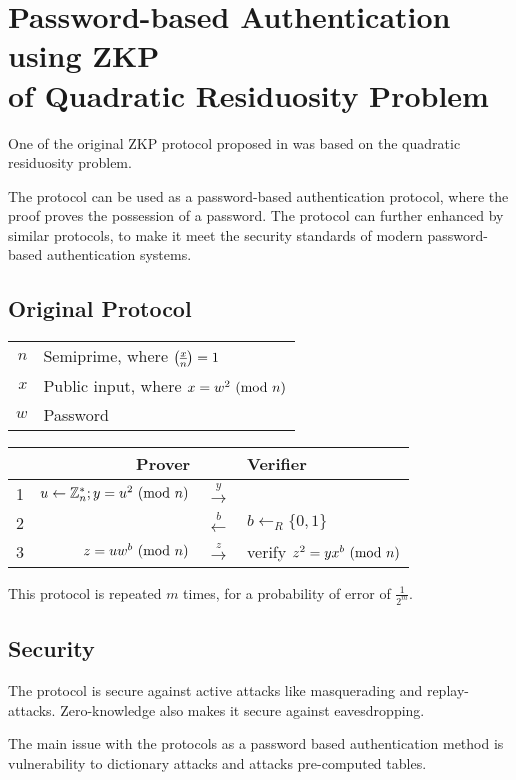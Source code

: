 \section{Password-based Authentication using ZKP\\ of Quadratic Residuosity Problem}

One of the original ZKP protocol proposed in \cite{GMR} was based on the quadratic residuosity problem.

The protocol can be used as a password-based authentication protocol, where the proof proves the possession of a password.
The protocol can further enhanced by similar protocols, to make it meet the security standards of modern password-based authentication systems.

\subsection{Original Protocol} %
\bigskip
\begin{center}
	\begin{tabular}{rl}
		$n$ & Semiprime, where $\legendre{x}{n} = 1$\\
 		$x$ & Public input, where $x = w^2 \ (\mathrm{mod}\ n)$\\
 		$w$ & Password\\
	\end{tabular}
\end{center}
\bigskip
\begin{center}
	\begin{tabular}{rr|c|l}
		& Prover && Verifier\\
		\hline
		1 & $u \leftarrow \Bbb{Z}_{n}^{*}; y = u^2 \ (\mathrm{mod}\ n)$ & $\xrightarrow{y}$\\
		2 & & $\xleftarrow{b}$ & $b \leftarrow_R \{0, 1\} $\\
		3 & $z = uw^b\ (\mathrm{mod}\ n)$ & $\xrightarrow z$ & verify $z^2 = yx^b \ (\mathrm{mod}\ n)$\\
	\end{tabular}
\end{center}
This protocol is repeated $m$ times, for a probability of error of $\frac{1}{2^m}$.
\subsection{Security}
The protocol is secure against active attacks like masquerading and replay-attacks. 
Zero-knowledge also makes it secure against eavesdropping.

The main issue with the protocols as a password based authentication method is vulnerability to dictionary attacks and attacks pre-computed tables.

